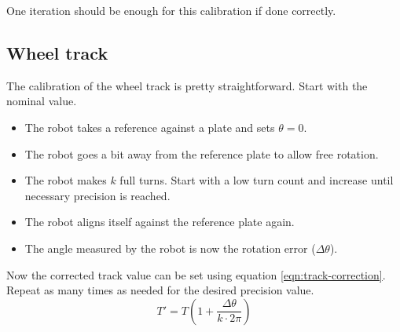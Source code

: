 \documentclass[a4paper, 10pt]{article}
\begin{document}
One iteration should be enough for this calibration if done correctly.



\subsection{Wheel track}
The calibration of the wheel track is pretty straightforward.
Start with the nominal value.
\begin{itemize}
    \item The robot takes a reference against a plate and sets $\theta = 0$.
    \item The robot goes a bit away from the reference plate to allow free rotation.
    \item The robot makes $k$ full turns.
        Start with a low turn count and increase until necessary precision is reached.
    \item The robot aligns itself against the reference plate again.
    \item The angle measured by the robot is now the rotation error ($\Delta \theta$).
\end{itemize}
Now the corrected track value can be set using equation \ref{eqn:track-correction}.
Repeat as many times as needed for the desired precision value.
\begin{equation}
    T' = T \left(1 + \frac{\Delta \theta}{k \cdot 2\pi}\right)
    \label{eqn:track-correction}
\end{equation}
\end{document}

